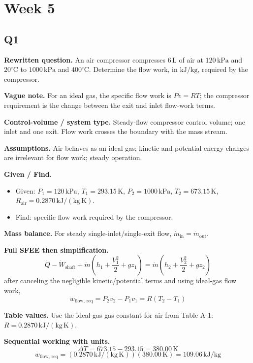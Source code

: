 \section*{Week 5}

\subsection*{Q1}
\textbf{Rewritten question.} An air compressor compresses $6\,\text{L}$ of air at $120\,\text{kPa}$ and $20^\circ\text{C}$ to $1000\,\text{kPa}$ and $400^\circ\text{C}$. Determine the flow work, in $\text{kJ/kg}$, required by the compressor.

\textbf{Vague note.} For an ideal gas, the specific flow work is $Pv=RT$; the compressor requirement is the change between the exit and inlet flow-work terms.

\textbf{Control-volume / system type.} Steady-flow compressor control volume; one inlet and one exit. Flow work crosses the boundary with the mass stream.

\textbf{Assumptions.} Air behaves as an ideal gas; kinetic and potential energy changes are irrelevant for flow work; steady operation.

\textbf{Given / Find.}
\begin{itemize}
  \item Given: $P_1=120\,\text{kPa}$, $T_1=293.15\,\text{K}$, $P_2=1000\,\text{kPa}$, $T_2=673.15\,\text{K}$, $R_{\text{air}}=0.2870\,\mathrm{kJ/(kg\,K)}$.
  \item Find: specific flow work required by the compressor.
\end{itemize}

\textbf{Mass balance.} For steady single-inlet/single-exit flow, $\dot m_{\text{in}}=\dot m_{\text{out}}$.

\textbf{Full SFEE then simplification.}
\[
\dot Q-\dot W_{\text{shaft}}+\dot m\left(h_1+\frac{V_1^2}{2}+gz_1\right)
=\dot m\left(h_2+\frac{V_2^2}{2}+gz_2\right)
\]
after canceling the negligible kinetic/potential terms and using ideal-gas flow work,
\[
w_{\text{flow, req}} = P_2v_2-P_1v_1 = R(T_2-T_1)
\]

\textbf{Table values.} Use the ideal-gas gas constant for air from Table A-1: $R=0.2870\,\mathrm{kJ/(kg\,K)}$.

\textbf{Sequential working with units.}
\[
\Delta T = 673.15-293.15 = 380.00\,\text{K}
\]
\[
w_{\text{flow, req}} = (0.2870\,\mathrm{kJ/(kg\,K)})(380.00\,\text{K}) = 109.06\,\text{kJ/kg}
\]

